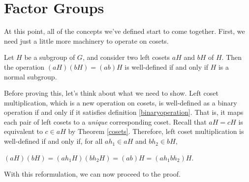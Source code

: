 \section{Factor Groups}

At this point, all of the concepts we've defined start to come together. First, we need just a little more machinery to operate on cosets.


\begin{theorem}
Let $H$ be a subgroup of $G$, and consider two left cosets $aH$ and $bH$ of $H$. Then the operation $(aH)(bH) = (ab)H$ is well-defined if and only if $H$ is a normal subgroup.
\end{theorem}

Before proving this, let's think about what we need to show. Left coset multiplication, which is a new operation on cosets, is well-defined as a binary operation if and only if it satisfies definition \ref{binaryoperation}. That is, it maps each pair of left cosets to a \textit{unique} corresponding coset. Recall that $aH = cH$ is equivalent to $c \in aH$ by Theorem \ref{cosets}. Therefore, left coset multiplication is well-defined if and only if, for all $ah_1 \in aH$ and $bh_2 \in bH$,

\begin{center}
    $(aH)(bH) = (ah_1H)(bh_2H) = (ab)H = (ah_1bh_2)H$.
\end{center}

With this reformulation, we can now proceed to the proof.

